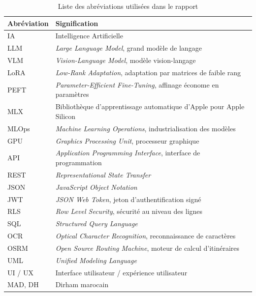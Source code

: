 \begin{table}[H]
\centering
\small
\begin{tabularx}{0.92\textwidth}{|L{2.6cm}|Y|}
\hline
{}\textbf{Abréviation} & \textbf{Signification} \\ \hline
IA      & Intelligence Artificielle \\ \hline
LLM     & \textit{Large Language Model}, grand modèle de langage \\ \hline
VLM     & \textit{Vision-Language Model}, modèle vision-langage \\ \hline
LoRA    & \textit{Low-Rank Adaptation}, adaptation par matrices de faible rang \\ \hline
PEFT    & \textit{Parameter-Efficient Fine-Tuning}, affinage économe en paramètres \\ \hline
MLX     & Bibliothèque d'apprentissage automatique d'Apple pour Apple Silicon \\ \hline
MLOps   & \textit{Machine Learning Operations}, industrialisation des modèles \\ \hline
GPU     & \textit{Graphics Processing Unit}, processeur graphique \\ \hline
API     & \textit{Application Programming Interface}, interface de programmation \\ \hline
REST    & \textit{Representational State Transfer} \\ \hline
JSON    & \textit{JavaScript Object Notation} \\ \hline
JWT     & \textit{JSON Web Token}, jeton d'authentification signé \\ \hline
RLS     & \textit{Row Level Security}, sécurité au niveau des lignes \\ \hline
SQL     & \textit{Structured Query Language} \\ \hline
OCR     & \textit{Optical Character Recognition}, reconnaissance de caractères \\ \hline
OSRM    & \textit{Open Source Routing Machine}, moteur de calcul d'itinéraires \\ \hline
UML     & \textit{Unified Modeling Language} \\ \hline
UI / UX & Interface utilisateur / expérience utilisateur \\ \hline
MAD, DH & Dirham marocain \\ \hline
\end{tabularx}
\caption{Liste des abréviations utilisées dans le rapport}
\end{table}
